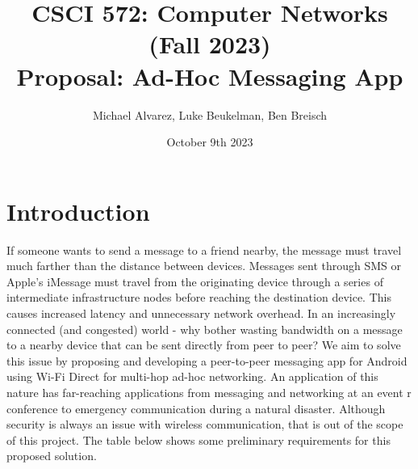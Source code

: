 \documentclass[10pt]{article}
\title{{\normalsize CSCI 572: Computer Networks (Fall 2023)}\\Proposal: Ad-Hoc Messaging App}
\author{Michael Alvarez, Luke Beukelman, Ben Breisch}
\date{October 9th 2023}
\begin{document}
\maketitle

\section{Introduction}
If someone wants to send a message to a friend nearby, the message must travel much farther than the distance between devices. Messages sent through SMS or Apple's iMessage must travel from the originating device through a series of intermediate infrastructure nodes before reaching the destination device. This causes increased latency and unnecessary network overhead. In an increasingly connected (and congested) world - why bother wasting bandwidth on a message to a nearby device that can be sent directly from peer to peer? We aim to solve this issue by proposing and developing a peer-to-peer messaging app for Android using Wi-Fi Direct for multi-hop ad-hoc networking. An application of this nature has far-reaching applications from messaging and networking at an event r conference to emergency communication during a natural disaster. Although security is always an issue with wireless communication, that is out of the scope of this project. The table below shows some preliminary requirements for this proposed solution.
\end{document}
